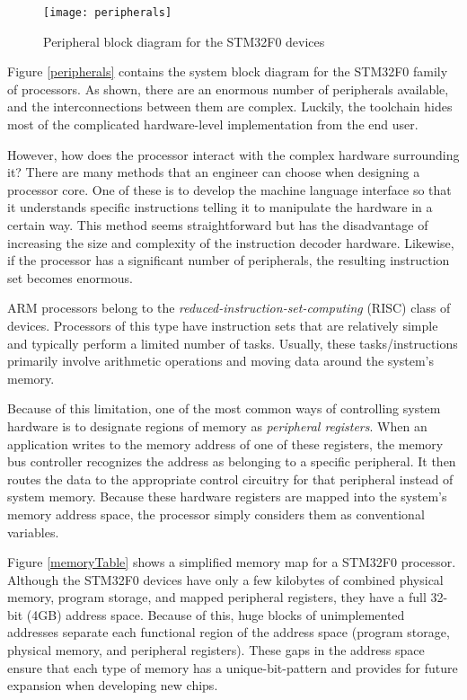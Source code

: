 \documentclass[11pt,fleqn]{book} %
\begin{document}
\begin{figure}[]
    \centering\texttt{[image: peripherals]}
    \caption{Peripheral block diagram for the STM32F0 devices}
    \label{peripherals}
\end{figure}

Figure \vref{peripherals} contains the system block diagram for the STM32F0 family of processors. As shown, there are an enormous number of peripherals available, and the interconnections between them are complex. Luckily, the toolchain hides most of the complicated hardware-level implementation from the end user.

However, how does the processor interact with the complex hardware surrounding it? There are many methods that an engineer can choose when designing a processor core. One of these is to develop the machine language interface so that it understands specific instructions telling it to manipulate the hardware in a certain way. This method seems straightforward but has the disadvantage of increasing the size and complexity of the instruction decoder hardware. Likewise, if the processor has a significant number of peripherals, the resulting instruction set becomes enormous. 

ARM processors belong to the \textit{reduced-instruction-set-computing} (RISC) class of devices. Processors of this type have instruction sets that are relatively simple and typically perform a limited number of tasks. Usually, these tasks/instructions primarily involve arithmetic operations and moving data around the system's memory.

Because of this limitation, one of the most common ways of controlling system hardware is to designate regions of memory as \textit{peripheral registers}. When an application writes to the memory address of one of these registers, the memory bus controller recognizes the address as belonging to a specific peripheral. It then routes the data to the appropriate control circuitry for that peripheral instead of system memory. Because these hardware registers are mapped into the system's memory address space, the processor simply considers them as conventional variables. 

Figure \vref{memoryTable} shows a simplified memory map for a STM32F0 processor. Although the STM32F0 devices have only a few kilobytes of combined physical memory, program storage, and mapped peripheral registers, they have a full 32-bit (4GB) address space. Because of this, huge blocks of unimplemented addresses separate each functional region of the address space (program storage, physical memory, and peripheral registers). These gaps in the address space ensure that each type of memory has a unique-bit-pattern and provides for future expansion when developing new chips. 
\end{document}
